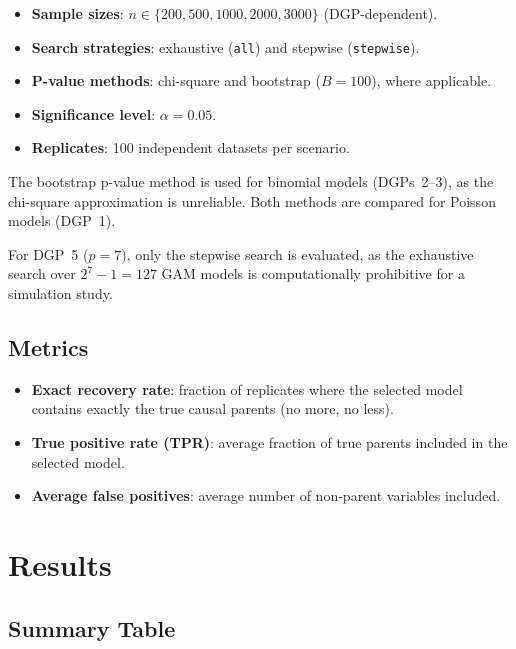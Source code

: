 \documentclass[11pt,a4paper]{article}
\begin{document}
\begin{itemize}
    \item \textbf{Sample sizes}: $n \in \{200, 500, 1000, 2000, 3000\}$ (DGP-dependent).
    \item \textbf{Search strategies}: exhaustive (\texttt{all}) and stepwise (\texttt{stepwise}).
    \item \textbf{P-value methods}: chi-square and bootstrap ($B = 100$), where applicable.
    \item \textbf{Significance level}: $\alpha = 0.05$.
    \item \textbf{Replicates}: 100 independent datasets per scenario.
\end{itemize}

The bootstrap p-value method is used for binomial models (DGPs~2--3), as the chi-square approximation is unreliable. Both methods are compared for Poisson models (DGP~1).

For DGP~5 ($p = 7$), only the stepwise search is evaluated, as the exhaustive search over $2^7 - 1 = 127$ GAM models is computationally prohibitive for a simulation study.

\subsection{Metrics}

\begin{itemize}
    \item \textbf{Exact recovery rate}: fraction of replicates where the selected model contains exactly the true causal parents (no more, no less).
    \item \textbf{True positive rate (TPR)}: average fraction of true parents included in the selected model.
    \item \textbf{Average false positives}: average number of non-parent variables included.
\end{itemize}

\section{Results}

\subsection{Summary Table}
\end{document}
